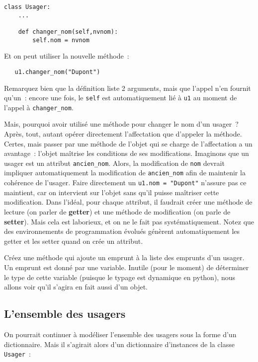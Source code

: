 \documentclass[10pt,a4paper]{sujets-exercices}
\begin{document}
\begin{verbatim}
class Usager:
    ...

    def changer_nom(self,nvnom):
        self.nom = nvnom
\end{verbatim}

Et on peut utiliser la nouvelle méthode~:

\begin{verbatim}
   u1.changer_nom("Dupont")
\end{verbatim}

Remarquez bien que la définition liste 2 arguments, mais que l'appel n'en fournit qu'un~: encore une fois, le \texttt{self} est automatiquement lié à \texttt{u1} au moment de l'appel à \texttt{changer\_nom}.

Mais, pourquoi avoir utilisé une méthode pour changer le nom d'un usager~? Après, tout, autant opérer directement l'affectation que d'appeler la méthode. Certes, mais passer par une méthode de l'objet qui se charge de l'affectation a un avantage~: l'objet maîtrise les conditions de ses modifications. Imaginons que un usager est un attribut \texttt{ancien\_nom}. Alors, la modification de \texttt{nom} devrait impliquer automatiquement la modification de \texttt{ancien\_nom} afin de maintenir la cohérence de l'usager. Faire directement un \texttt{u1.nom = "Dupont"} n'assure pas ce maintient, car on intervient sur l'objet sans qu'il puisse maîtriser cette modification. Dans l'idéal, pour chaque attribut, il faudrait créer une méthode de lecture (on parler de \textbf{getter}) et une méthode de modification (on parle de \textbf{setter}). Mais cela est laborieux, et on ne le fait pas systématiquement. Notez que des environnements de programmation évolués génèrent automatiquement les getter et les setter quand on crée un attribut.

\exercice{} Créez une méthode qui ajoute un emprunt à la liste des emprunts d'un usager. Un emprunt est donné par une variable. Inutile (pour le moment) de déterminer le type de cette variable (puisque le typage est dynamique en python), nous allons voir qu'il s'agira en fait aussi d'un objet.

\subsection*{L'ensemble des usagers}

On pourrait continuer à modéliser l'ensemble des usagers sous la forme d'un dictionnaire. Mais il s'agirait alors d'un dictionnaire d'instances de la classe \texttt{Usager}~:
\end{document}
